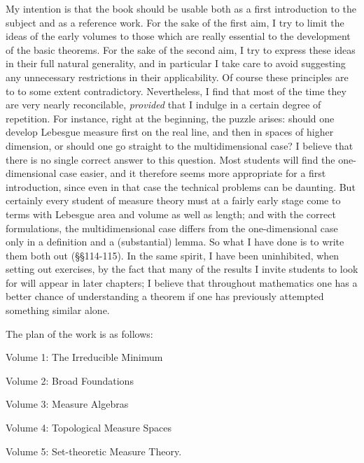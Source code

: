 My intention is that the book should be usable both as a first
introduction to the subject and as a reference work.   For the sake of
the first aim, I try to limit the ideas of the early volumes to those
which are really essential to the development of the basic theorems.
For the sake of the second aim, I try to express these ideas in their
full natural generality, and in particular I take care to avoid
suggesting any unnecessary restrictions in their applicability.   Of
course these principles are to to some extent contradictory.
Nevertheless, I find that most of the time they are very nearly
reconcilable, {\it provided} that I indulge in a certain degree of
repetition.   For instance, right at the beginning, the puzzle arises:
should one develop Lebesgue measure first on the real line, and then in
spaces of higher dimension, or should one go straight to the
multidimensional case?   I believe that there is no single correct
answer to this question.   Most students will find the one-dimensional
case easier, and it therefore seems more appropriate for a first
introduction, since even in that case the technical problems can be
daunting.   But certainly every student of measure theory must at a
fairly early stage
come to terms with Lebesgue area and volume as well as length;
and with the correct formulations, the multidimensional case differs
from the one-dimensional case only in a definition and a (substantial)
lemma.   So what I have done is to write them both out (\S\S114-115).
In the same spirit, I have been uninhibited, when setting out exercises,
by the fact that many of the results I invite students to look for will
appear in later chapters;  I believe that throughout mathematics one has
a better chance of understanding a theorem if one has previously
attempted something similar alone.

The plan of the work is as follows:

\medskip

\qquad\qquad Volume 1:  The Irreducible Minimum

\qquad\qquad Volume 2:  Broad Foundations

\qquad\qquad Volume 3:  Measure Algebras

\qquad\qquad Volume 4:  Topological Measure Spaces

\qquad\qquad Volume 5:  Set-theoretic Measure Theory.

\medskip

